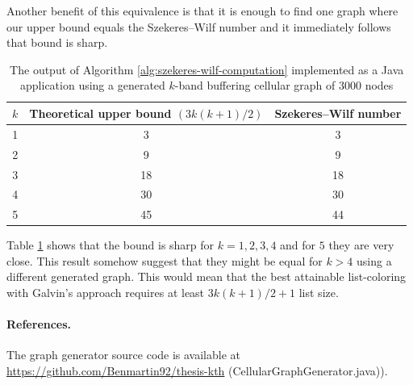 \documentclass[a4paper, 12pt]{article}
\begin{document}
Another benefit of this equivalence is that it is enough to find one graph where our upper bound equals the Szekeres\---Wilf number and it immediately follows that bound is sharp.
\begin{table}[h!]
\centering
\begin{tabular}{|c|c|c|}
\hline
 $k$& Theoretical upper bound $(3k(k+1)/2)$ & Szekeres\---Wilf number \\ \hline
 1&  3&  3 \\ \hline
 2&  9&  9\\ \hline
 3&  18& 18\\ \hline
 4&  30& 30\\ \hline
 5&  45& 44 \\ \hline
\end{tabular}
\caption{The output of Algorithm \ref{alg:szekeres-wilf-computation} implemented as a Java application using a generated $k$-band buffering cellular graph of $3000$ nodes}
\label{eval-szekeres}
\end{table}

Table \ref{eval-szekeres} shows that the bound is sharp for $k=1,2,3,4$ and for $5$ they are very close. This result somehow suggest that they might be equal for $k > 4$ using a different generated graph. This would mean that the best attainable list-coloring with Galvin's approach requires at least $3k(k+1)/2+1$ list size.
\paragraph*{References.} The graph generator source code is available at \url{https://github.com/Benmartin92/thesis-kth} (CellularGraphGenerator.java)).
\newpage
\printbibliography
{}
\end{document}
